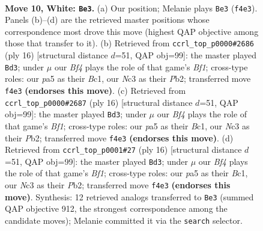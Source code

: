 \documentclass[11pt]{article}
\begin{document}
\clearpage

\begin{figure}[p]\centering
\begin{subfigure}{0.46\textwidth}\centering
\resizebox{\linewidth}{!}{%
\newchessgame
\chessboard[
  setfen={rnbqkb1r/5p2/1p1p1np1/p1pP3p/P3PB2/2N5/1P3PPP/R2QKBNR w KQkq - 0 10},
  showmover=false,
  pgfstyle=straightmove, color=movearrow, markmove={f4-e3}
]}
\caption{}
\end{subfigure}\hfill
\begin{subfigure}{0.46\textwidth}\centering
\resizebox{\linewidth}{!}{%
\newchessgame
\chessboard[
  setfen={rnbqkb1r/5p1p/p2p1np1/1ppP4/4P3/2N2N1P/PP3PP1/R1BQKB1R w KQkq - 0 9},
  showmover=false,
  pgfstyle=straightmove, color=movearrow, markmove={f1-d3}
]}
\caption{}
\end{subfigure}
\\[4pt]
\begin{subfigure}{0.46\textwidth}\centering
\resizebox{\linewidth}{!}{%
\newchessgame
\chessboard[
  setfen={rnbqkb1r/5p1p/p2p1np1/1ppP4/4P3/2N2N1P/PP3PP1/R1BQKB1R w KQkq - 0 9},
  showmover=false,
  pgfstyle=straightmove, color=movearrow, markmove={f1-d3}
]}
\caption{}
\end{subfigure}\hfill
\begin{subfigure}{0.46\textwidth}\centering
\resizebox{\linewidth}{!}{%
\newchessgame
\chessboard[
  setfen={rnbqkb1r/5p1p/p2p1np1/1ppP4/4P3/2N2N1P/PP3PP1/R1BQKB1R w KQkq - 0 9},
  showmover=false,
  pgfstyle=straightmove, color=movearrow, markmove={f1-d3}
]}
\caption{}
\end{subfigure}
\caption{\textbf{Move 10, White: \texttt{Be3}.} (a) Our position; Melanie plays \texttt{Be3} (\texttt{f4e3}). Panels (b)--(d) are the retrieved master positions whose correspondence most drove this move (highest QAP objective among those that transfer to it). (b) Retrieved from \texttt{ccrl\_top\_p0000\#2686} (ply 16) [structural distance $d$=51, QAP obj=99]: the master played \texttt{Bd3}; under $\mu$ our \emph{Bf4} plays the role of that game's \emph{Bf1}; cross-type roles: our \emph{p}a5 as their \emph{B}c1, our \emph{N}c3 as their \emph{P}b2; transferred move \texttt{f4e3} \textbf{(endorses this move)}. (c) Retrieved from \texttt{ccrl\_top\_p0000\#2687} (ply 16) [structural distance $d$=51, QAP obj=99]: the master played \texttt{Bd3}; under $\mu$ our \emph{Bf4} plays the role of that game's \emph{Bf1}; cross-type roles: our \emph{p}a5 as their \emph{B}c1, our \emph{N}c3 as their \emph{P}b2; transferred move \texttt{f4e3} \textbf{(endorses this move)}. (d) Retrieved from \texttt{ccrl\_top\_p0001\#27} (ply 16) [structural distance $d$=51, QAP obj=99]: the master played \texttt{Bd3}; under $\mu$ our \emph{Bf4} plays the role of that game's \emph{Bf1}; cross-type roles: our \emph{p}a5 as their \emph{B}c1, our \emph{N}c3 as their \emph{P}b2; transferred move \texttt{f4e3} \textbf{(endorses this move)}. Synthesis: 12 retrieved analogs transferred to \texttt{Be3} (summed QAP objective 912, the strongest correspondence among the candidate moves); Melanie committed it via the \texttt{search} selector.}
\label{fig:thought-m18}
\end{figure}
\end{document}
